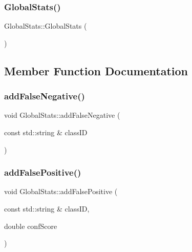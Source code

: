 \subsubsection{\texorpdfstring{Global\+Stats()}{GlobalStats()}}
{\footnotesize\ttfamily Global\+Stats\+::\+Global\+Stats (\begin{DoxyParamCaption}{ }\end{DoxyParamCaption})\hspace{0.3cm}{\ttfamily [default]}}



\subsection{Member Function Documentation}
\mbox{\label{class_global_stats_a667d0c7293eadc152d9de17aa1b6d40e}} 
\subsubsection{\texorpdfstring{add\+False\+Negative()}{addFalseNegative()}}
{\footnotesize\ttfamily void Global\+Stats\+::add\+False\+Negative (\begin{DoxyParamCaption}\item[{const std\+::string \&}]{class\+ID }\end{DoxyParamCaption})}

\mbox{\label{class_global_stats_ad3b7ccc1ad4191394357d7280b04d13c}} 
\subsubsection{\texorpdfstring{add\+False\+Positive()}{addFalsePositive()}}
{\footnotesize\ttfamily void Global\+Stats\+::add\+False\+Positive (\begin{DoxyParamCaption}\item[{const std\+::string \&}]{class\+ID,  }\item[{double}]{conf\+Score }\end{DoxyParamCaption})}

\mbox{\label{class_global_stats_a2c29f0dbc05606ac58ae49a1dedeef78}} 
